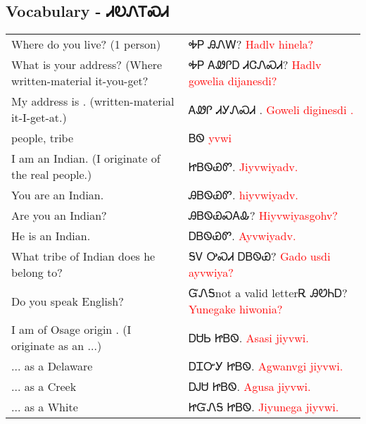 \newpage\subsection{Vocabulary - ᏗᎧᏁᎢᏍᏗ 
}
\begin{minipage}{\linewidth}
\begin{tabular}{p{5cm} p{9cm}}
Where do you live? (1 person) & ᎭᏢ ᎯᏁᎳ? 
 \newline \textcolor{red}{Hadlv hinela?}\\
What is your address? (Where written-material it-you-get? & ᎭᏢ ᎪᏪᎵᎠ ᏗᏣᏁᏍᏗ? 
 \newline \textcolor{red}{Hadlv gowelia dijanesdi?}\\
My address is \underline{      }. (written-material it-I-get-at.) & ᎪᏪᎵ ᏗᎩᏁᏍᏗ    . 
 \newline \textcolor{red}{Goweli diginesdi    .}\\
people, tribe & ᏴᏫ 
 \newline \textcolor{red}{yvwi}\\
I am an Indian. (I originate of the real people.) & ᏥᏴᏫᏯᏛ. 
 \newline \textcolor{red}{Jiyvwiyadv.}\\
You are an Indian. & ᎯᏴᏫᏯᏛ. 
 \newline \textcolor{red}{hiyvwiyadv.}\\
Are you an Indian? & ᎯᏴᏫᏯᏍᎪᎲ? 
 \newline \textcolor{red}{Hiyvwiyasgohv?}\\
He is an Indian. & ᎠᏴᏫᏯᏛ. 
 \newline \textcolor{red}{Ayvwiyadv.}\\
What tribe of Indian does he belong to? & ᎦᏙ ᎤᏍᏗ ᎠᏴᏫᏯ? 
 \newline \textcolor{red}{Gado usdi ayvwiya?}\\
Do you speak English? & ᏳᏁᎦnot a valid letterᎡ ᎯᏬᏂᎠ? 
 \newline \textcolor{red}{Yunegake hiwonia?}\\
I am of Osage origin . (I originate as an ...) & ᎠᏌᏏ ᏥᏴᏫ. 
 \newline \textcolor{red}{Asasi jiyvwi.}\\
... as a Delaware & ᎠᏆᏅᎩ ᏥᏴᏫ. 
 \newline \textcolor{red}{Agwanvgi jiyvwi.}\\
... as a Creek & ᎠᎫᏌ ᏥᏴᏫ. 
 \newline \textcolor{red}{Agusa jiyvwi.}\\
... as a White & ᏥᏳᏁᎦ ᏥᏴᏫ. 
 \newline \textcolor{red}{Jiyunega jiyvwi.}\\

\end{tabular}
\end{minipage}
